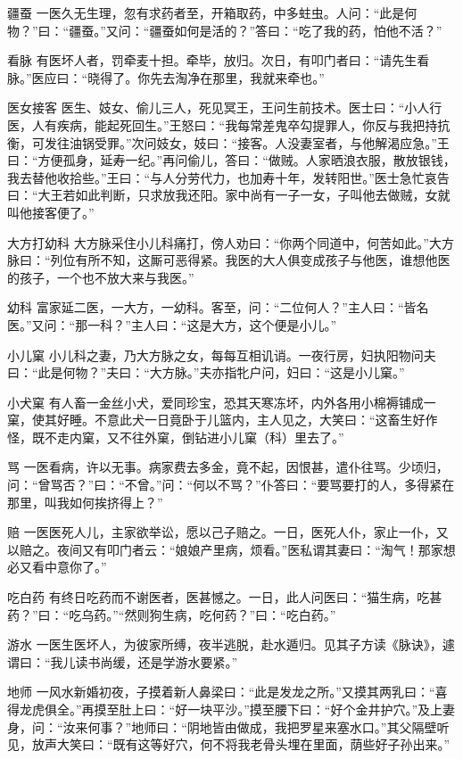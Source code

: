 \documentclass[12pt,UTF8]{ctexbook}
\begin{document}
疆蚕
一医久无生理，忽有求药者至，开箱取药，中多蛀虫。人问：“此是何物？”曰：“疆蚕。”又问：“疆蚕如何是活的？”答曰：“吃了我的药，怕他不活？”

看脉
有医坏人者，罚牵麦十担。牵毕，放归。次日，有叩门者曰：“请先生看脉。”医应曰：“晓得了。你先去淘净在那里，我就来牵也。”

医女接客
医生、妓女、偷儿三人，死见冥王，王问生前技术。医士曰：“小人行医，人有疾病，能起死回生。”王怒曰：“我每常差鬼卒勾提罪人，你反与我把持抗衡，可发往油锅受罪。”次问妓女，妓曰：“接客。人没妻室者，与他解渴应急。”王曰：“方便孤身，延寿一纪。”再问偷儿，答曰：“做贼。人家晒浪衣服，散放银钱，我去替他收拾些。”王曰：“与人分劳代力，也加寿十年，发转阳世。”医士急忙哀告曰：“大王若如此判断，只求放我还阳。家中尚有一子一女，子叫他去做贼，女就叫他接客便了。”

大方打幼科
大方脉采住小儿科痛打，傍人劝曰：“你两个同道中，何苦如此。”大方脉曰：“列位有所不知，这厮可恶得紧。我医的大人俱变成孩子与他医，谁想他医的孩子，一个也不放大来与我医。”

幼科
富家延二医，一大方，一幼科。客至，问：“二位何人？”主人曰：“皆名医。”又问：“那一科？”主人曰：“这是大方，这个便是小儿。”

小儿窠
小儿科之妻，乃大方脉之女，每每互相讥诮。一夜行房，妇执阳物问夫曰：“此是何物？”夫曰：“大方脉。”夫亦指牝户问，妇曰：“这是小儿窠。”

小犬窠
有人畜一金丝小犬，爱同珍宝，恐其天寒冻坏，内外各用小棉褥铺成一窠，使其好睡。不意此犬一日竟卧于儿篮内，主人见之，大笑曰：“这畜生好作怪，既不走内窠，又不往外窠，倒钻进小儿窠（科）里去了。”

骂
一医看病，许以无事。病家费去多金，竟不起，因恨甚，遣仆往骂。少顷归，问：“曾骂否？”曰：“不曾。”问：“何以不骂？”仆答曰：“要骂要打的人，多得紧在那里，叫我如何挨挤得上？”

赔
一医医死人儿，主家欲举讼，愿以己子赔之。一日，医死人仆，家止一仆，又以赔之。夜间又有叩门者云：“娘娘产里病，烦看。”医私谓其妻曰：“淘气！那家想必又看中意你了。”

吃白药
有终日吃药而不谢医者，医甚憾之。一日，此人问医曰：“猫生病，吃甚药？”曰：“吃乌药。”“然则狗生病，吃何药？”曰：“吃白药。”

游水
一医生医坏人，为彼家所缚，夜半逃脱，赴水遁归。见其子方读《脉诀》，遽谓曰：“我儿读书尚缓，还是学游水要紧。”

地师
一风水新婚初夜，子摸着新人鼻梁曰：“此是发龙之所。”又摸其两乳曰：“喜得龙虎俱全。”再摸至肚上曰：“好一块平沙。”摸至腰下曰：“好个金井护穴。”及上妻身，问：“汝来何事？”地师曰：“阴地皆由做成，我把罗星来塞水口。”其父隔壁听见，放声大笑曰：“既有这等好穴，何不将我老骨头埋在里面，荫些好子孙出来。”
\end{document}
